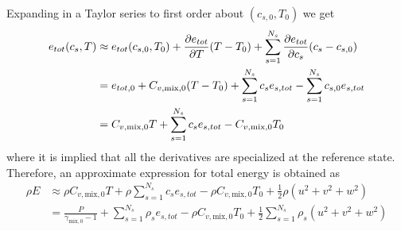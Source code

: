 Expanding in a Taylor series to first order about $(c_{s,0},T_0)$ we get
%
\begin{equation}
\begin{split}
e_{tot}(c_s, T) 
&\approx e_{tot}(c_{s,0}, T_0) 
 + \frac{\partial e_{tot}}{\partial T} (T-T_0) + \sum_{s=1}^{N_s} \frac{\partial e_{tot}}{\partial c_s} (c_s-c_{s,0})\\
&= e_{tot,0}
 + C_{v,\text{mix},0} (T-T_0) + \sum_{s=1}^{N_s} c_s e_{s,tot} - \sum_{s=1}^{N_s}  c_{s,0} e_{s,tot} \\
&= C_{v,\text{mix},0}  T      + \sum_{s=1}^{N_s} c_s e_{s,tot} - C_{v,\text{mix},0} T_0  \\
\end{split}
\end{equation}
%
where it is implied that all the derivatives are specialized at the reference state.
Therefore, an approximate expression for total energy is obtained as
\begin{equation}
\begin{split}
\rho E 
&\approx \rho C_{v,\text{mix},0} T 
   + \rho \sum_{s=1}^{N_s} c_s e_{s,tot} 
   - \rho C_{v,\text{mix},0} T_0 
   + \frac{1}{2} \rho \left( u^2 + v^2+ w^2 \right) \\
&= \frac{P}{\gamma_{\text{mix},0}-1}
   + \sum_{s=1}^{N_s} \rho_s e_{s,tot}
   - \rho C_{v,\text{mix},0} T_0 
   + \frac{1}{2} \sum_{s=1}^{N_s} \rho_s \left( u^2 + v^2+ w^2 \right)
\end{split}
\end{equation}

